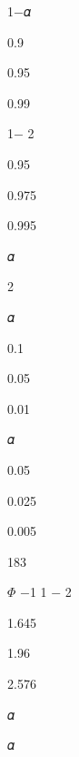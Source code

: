 \documentclass[a4paper,portrait,12pt]{article}
\begin{document}
\begin{flushleft}
1$-$𝛼
\end{flushleft}


0.9


0.95


0.99





1$-$ 2


0.95


0.975


0.995





\begin{flushleft}
𝛼
\end{flushleft}


2





\begin{flushleft}
𝛼
\end{flushleft}


0.1


0.05


0.01





\begin{flushleft}
𝛼
\end{flushleft}





0.05


0.025


0.005





183





\begin{flushleft}
$\Phi$ $-$1 1 $-$ 2
\end{flushleft}


1.645


1.96


2.576





\begin{flushleft}
𝛼
\end{flushleft}


\begin{flushleft}
𝛼
\end{flushleft}
\end{document}
